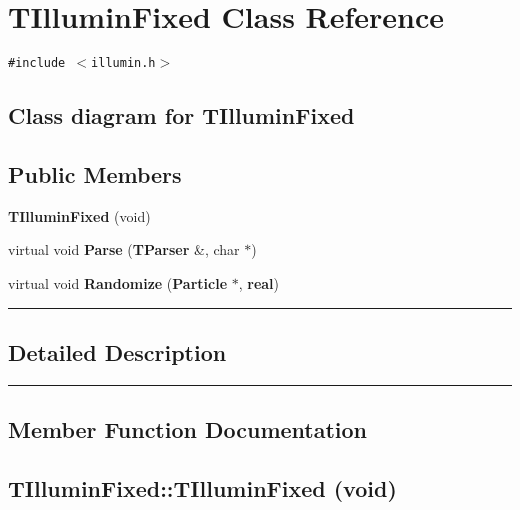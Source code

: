 \section{TIlluminFixed  Class Reference}
\label{TIlluminFixed}


{\tt \#include $<$illumin.h$>$}

\subsection*{Class diagram for TIlluminFixed}
\begin{figure}[H]
\begin{center}
\leavevmode
\setlength{\epsfysize}{2cm}
\end{center}
\end{figure}
\subsection*{Public Members}
\begin{CompactItemize}
\item 
{\bf TIllumin\-Fixed} (void)
\item 
virtual void {\bf Parse} ({\bf TParser} \&, char $\ast$)
\item 
virtual void {\bf Randomize} ({\bf Particle} $\ast$, {\bf real})
\end{CompactItemize}
\vspace{0.4cm}\hrule\vspace{0.2cm}
\subsection*{Detailed Description}
\vspace{0.4cm}\hrule\vspace{0.2cm}
\subsection*{Member Function Documentation}
\label{TIlluminFixed_a0}
\subsection{\setlength{\rightskip}{0pt plus 5cm}TIllumin\-Fixed::TIllumin\-Fixed (void)}

\label{TIlluminFixed_a1}
